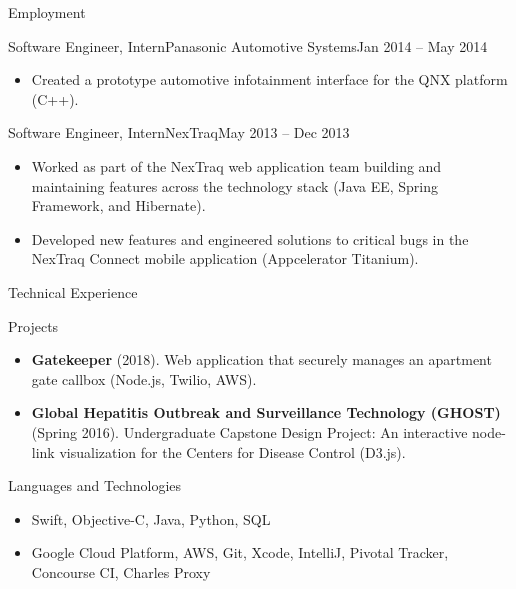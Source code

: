 \documentclass[]{mcdowellcv}
\begin{document}
\begin{cvsection}{Employment}
		\begin{cvsubsection}{Software Engineer, Intern}{Panasonic Automotive Systems}{Jan 2014 -- May 2014}
			\begin{itemize}
				\item Created a prototype automotive infotainment interface for the QNX platform (C++).
			\end{itemize}
		\end{cvsubsection}

		\begin{cvsubsection}{Software Engineer, Intern}{NexTraq}{May 2013 -- Dec 2013}
			\begin{itemize}
				\item Worked as part of the NexTraq web application team building and maintaining features across the technology stack (Java EE, Spring Framework, and Hibernate).
				\item Developed new features and engineered solutions to critical bugs in the NexTraq Connect mobile application (Appcelerator Titanium).
			\end{itemize}
		\end{cvsubsection}
	\end{cvsection}
	
	\begin{cvsection}{Technical Experience}
		\begin{cvsubsection}{Projects}{}{}
			\begin{itemize}
				\item \textbf{Gatekeeper} (2018). Web application that securely manages an apartment gate callbox (Node.js, Twilio, AWS).
				\item \textbf{Global Hepatitis Outbreak and Surveillance Technology (GHOST)} (Spring 2016). Undergraduate Capstone Design Project: An interactive node-link visualization for the Centers for Disease Control (D3.js).
			\end{itemize}
		\end{cvsubsection}
	\end{cvsection}
	
	\begin{cvsection}{Languages and Technologies}
		\begin{cvsubsection}{}{}{}	
			\begin{itemize}
				\item Swift, Objective-C, Java, Python, SQL
				\item Google Cloud Platform, AWS, Git, Xcode, IntelliJ, Pivotal Tracker, Concourse CI, Charles Proxy
			\end{itemize}
		\end{cvsubsection}
	\end{cvsection}
	
\end{document}
